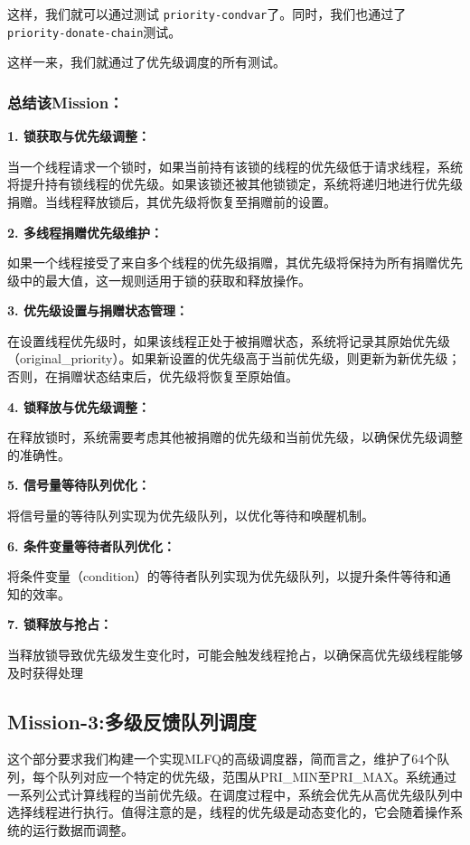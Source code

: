 \documentclass{article}
\begin{document}
	这样，我们就可以通过测试 \texttt{priority-condvar}了。同时，我们也通过了\texttt{priority-donate-chain}测试。
	
	这样一来，我们就通过了优先级调度的所有测试。
	
	\subsubsection{总结该Mission：}
	
	\textbf{1. 锁获取与优先级调整：}
	
	当一个线程请求一个锁时，如果当前持有该锁的线程的优先级低于请求线程，系统将提升持有锁线程的优先级。如果该锁还被其他锁锁定，系统将递归地进行优先级捐赠。当线程释放锁后，其优先级将恢复至捐赠前的设置。
	
	\textbf{2. 多线程捐赠优先级维护：}
	
	如果一个线程接受了来自多个线程的优先级捐赠，其优先级将保持为所有捐赠优先级中的最大值，这一规则适用于锁的获取和释放操作。
	
	\textbf{3. 优先级设置与捐赠状态管理：}
	
	在设置线程优先级时，如果该线程正处于被捐赠状态，系统将记录其原始优先级（original\_priority）。如果新设置的优先级高于当前优先级，则更新为新优先级；否则，在捐赠状态结束后，优先级将恢复至原始值。
	
	\textbf{4. 锁释放与优先级调整：}
	
	在释放锁时，系统需要考虑其他被捐赠的优先级和当前优先级，以确保优先级调整的准确性。
	
	\textbf{5. 信号量等待队列优化：}
	
	将信号量的等待队列实现为优先级队列，以优化等待和唤醒机制。
	
	\textbf{6. 条件变量等待者队列优化：}
	
	将条件变量（condition）的等待者队列实现为优先级队列，以提升条件等待和通知的效率。
	
	\textbf{7. 锁释放与抢占：}
	
	当释放锁导致优先级发生变化时，可能会触发线程抢占，以确保高优先级线程能够及时获得处理
	
	\subsection{Mission-3:多级反馈队列调度}
	
	这个部分要求我们构建一个实现MLFQ的高级调度器，简而言之，维护了64个队列，每个队列对应一个特定的优先级，范围从PRI\_MIN至PRI\_MAX。系统通过一系列公式计算线程的当前优先级。在调度过程中，系统会优先从高优先级队列中选择线程进行执行。值得注意的是，线程的优先级是动态变化的，它会随着操作系统的运行数据而调整。
	
\end{document}
